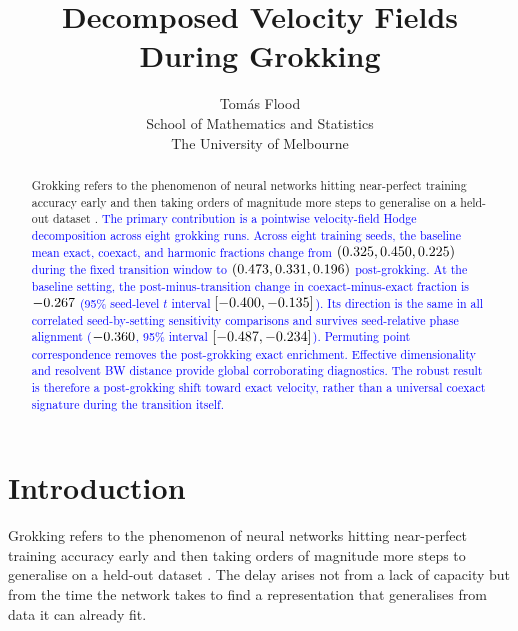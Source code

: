 \documentclass[11pt]{article}
\title{Decomposed Velocity Fields During Grokking}
\author{Tom\'as Flood\\School of Mathematics and Statistics\\The University of Melbourne}
\date{}
\newcommand{\addedtext}[1]{\textcolor{blue}{#1}}
\theoremstyle{remark}
\begin{document}
\maketitle

\begin{abstract}
Grokking refers to the phenomenon of neural networks hitting near-perfect training accuracy early and then taking orders of magnitude more steps to generalise on a held-out dataset \citep{power2022grokking}. \addedtext{The primary contribution is a pointwise velocity-field Hodge decomposition across eight grokking runs. Across eight training seeds, the baseline mean exact, coexact, and harmonic fractions change from $(0.325,0.450,0.225)$ during the fixed transition window to $(0.473,0.331,0.196)$ post-grokking. At the baseline setting, the post-minus-transition change in coexact-minus-exact fraction is $-0.267$ (95\% seed-level $t$ interval $[-0.400,-0.135]$). Its direction is the same in all \HodgeSensitivityComparisons{} correlated seed-by-setting sensitivity comparisons and survives seed-relative phase alignment ($-0.360$, 95\% interval $[-0.487,-0.234]$). Permuting point correspondence removes the post-grokking exact enrichment. Effective dimensionality and resolvent BW distance provide global corroborating diagnostics. The robust result is therefore a post-grokking shift toward exact velocity, rather than a universal coexact signature during the transition itself.}
\end{abstract}

\section{Introduction}

Grokking refers to the phenomenon of neural networks hitting near-perfect training accuracy early and then taking orders of magnitude more steps to generalise on a held-out dataset \citep{power2022grokking}. The delay arises not from a lack of capacity but from the time the network takes to find a representation that generalises from data it can already fit.
\end{document}
